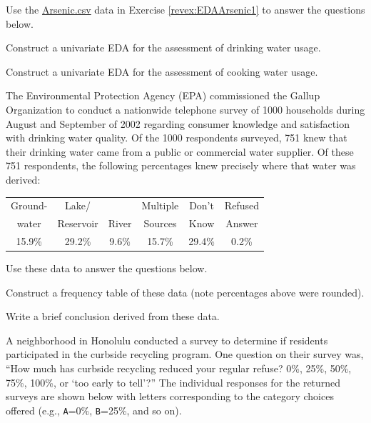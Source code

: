 \documentclass[10pt,openany]{book}\usepackage[]{graphicx}\usepackage[]{color}
\begin{document}
\vspace{-12pt}
\begin{exsection}
  \item \label{revex:EDAArsenic2} \rhw{} Use the \href{https://raw.githubusercontent.com/droglenc/NCData/master/Arsenic.csv}{Arsenic.csv} data in Exercise \ref{revex:EDAArsenic1} to answer the questions below. 
  \begin{Enumerate}
    \item Construct a univariate EDA for the assessment of drinking water usage.
    \item Construct a univariate EDA for the assessment of cooking water usage.
  \end{Enumerate}

  \item \label{revex:cuEDAEPA}The Environmental Protection Agency (EPA) commissioned the Gallup Organization to conduct a nationwide telephone survey of 1000 households during August and September of 2002 regarding consumer knowledge and satisfaction with drinking water quality.  Of the 1000 respondents surveyed, 751 knew that their drinking water came from a public or commercial water supplier.  Of these 751 respondents, the following percentages knew precisely where that water was derived:

  \begin{center}
  \begin{tabular}{c|c|c|c|c|c}
    \hline\hline
    Ground- & Lake/ &  & Multiple & Don't & Refused \\
    water & Reservoir & River & Sources & Know & Answer \\
    \hline
    15.9\% & 29.2\% & 9.6\% & 15.7\% & 29.4\% & 0.2\% \\
    \hline\hline
  \end{tabular}
  \end{center}

  Use these data to answer the questions below. 
  \begin{Enumerate}
    \item Construct a frequency table of these data (note percentages above were rounded).
    \item Write a brief conclusion derived from these data.
  \end{Enumerate}

  \item \label{revex:cuEDAHI} \rhw{} A neighborhood in Honolulu conducted a survey to determine if residents participated in the curbside recycling program.  One question on their survey was, ``How much has curbside recycling reduced your regular refuse? 0\%, 25\%, 50\%, 75\%, 100\%, or `too early to tell'?''  The individual responses for the returned surveys are shown below with letters corresponding to the category choices offered (e.g., \verb"A"=0\%, \verb"B"=25\%, and so on).


\end{exsection}
\end{document}
